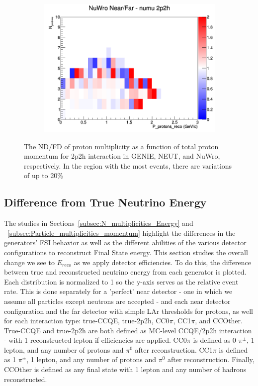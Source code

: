 \documentclass[12pt]{article}
\begin{document}
\begin{figure}[h]
\begin{subfigure}[b]{0.32\textwidth}
\includegraphics[width=\linewidth]{eff_N_P/LAr/protons/ratios/2p2h_NuWro_numu_NF_N_P.png}
\end{subfigure}
\caption{The ND/FD of proton multiplicity as a function of total proton momentum for 2p2h interaction in GENIE, NEUT, and NuWro, respectively. In the region with the most events, there are variations of up to 20\%}
\label{fig:proton_multiplicity_2p2h_NF_eff}
\end{figure}



\subsection{Difference from True Neutrino Energy}
\label{subsec:EDiff}
The studies in Sections~\ref{subsec:N_multiplicities_Energy} and ~\ref{subsec:Particle_multiplicities_momentum} highlight the differences in the generators' FSI behavior as well as the different abilities of the various detector configurations to reconstruct Final State energy. This section studies the overall change we see to $E_{reco}$ as we apply detector efficiencies. To do this, the difference between true and reconstructed neutrino energy from each generator is plotted. Each distribution is normalized to 1 so the y-axis serves as the relative event rate. This is done separately for a 'perfect' near detector - one in which we assume all particles except neutrons are accepted - and each near detector configuration and the far detector with simple LAr thresholds for protons, as well for each interaction type: true-CCQE, true-2p2h, CC0$\pi$, CC1$\pi$, and CCOther. True-CCQE and true-2p2h are both defined as MC-level CCQE/2p2h interaction - with 1 reconstructed lepton if efficiencies are applied. CC0$\pi$ is defined as 0 $\pi^{\pm}$, 1 lepton, and any number of protons and $\pi^0$ after reconstruction. CC1$\pi$ is defined as 1 $\pi^{\pm}$, 1 lepton, and any number of protons and $\pi^0$ after reconstruction. Finally, CCOther is defined as any final state with 1 lepton and any number of hadrons reconstructed.
\end{document}
